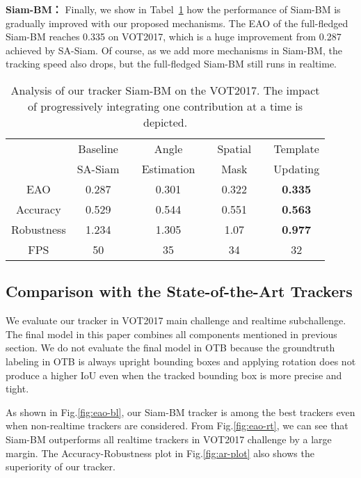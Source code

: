 \documentclass[runningheads]{llncs}
\begin{document}
\textbf{Siam-BM： }Finally, we show in Tabel~\ref{table:final-combine} how the performance of Siam-BM is gradually improved with our proposed mechanisms. The EAO of the full-fledged Siam-BM reaches 0.335 on VOT2017, which is a huge improvement from 0.287 achieved by SA-Siam. Of course, as we add more mechanisms in Siam-BM, the tracking speed also drops, but the full-fledged Siam-BM still runs in realtime. 

\setlength{\tabcolsep}{4pt}
\begin{table}
\begin{center}
\caption{Analysis of our tracker Siam-BM on the VOT2017. The impact of progressively integrating one contribution at a time is depicted.}
\label{table:final-combine}
\begin{tabular}{|c|ccccccc|}
\hline
& Baseline && Angle && Spatial && Template\\
& SA-Siam && Estimation && Mask && Updating\\
\hline
EAO & 0.287 && 0.301 && 0.322 && \textbf{0.335} \\
Accuracy & 0.529 && 0.544 && 0.551 && \textbf{0.563} \\
Robustness & 1.234 && 1.305 && 1.07 && \textbf{0.977} \\
\hline
FPS & 50 && 35 && 34 && 32\\
\hline
\end{tabular}
\end{center}
\end{table}
\setlength{\tabcolsep}{1.4pt}



\subsection{Comparison with the State-of-the-Art Trackers}
We evaluate our tracker in VOT2017 main challenge and realtime subchallenge. The final model in this paper combines all components mentioned in previous section. We do not evaluate the final model in OTB because the groundtruth labeling in OTB is always upright bounding boxes and applying rotation does not produce a higher IoU even when the tracked bounding box is more precise and tight. 

As shown in Fig.\ref{fig:eao-bl}, our Siam-BM tracker is among the best trackers even when non-realtime trackers are considered. From Fig.\ref{fig:eao-rt}, we can see that Siam-BM outperforms all realtime trackers in VOT2017 challenge by a large margin. The Accuracy-Robustness plot in Fig.\ref{fig:ar-plot} also shows the superiority of our tracker. 
\end{document}
